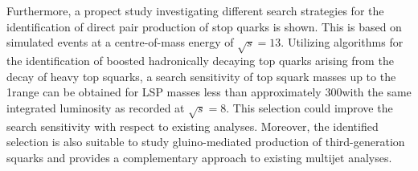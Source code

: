 Furthermore, a propect study investigating different search strategies for the identification of direct pair production of stop quarks is shown. This is based on simulated events at a centre-of-mass energy of $\sqrt{s}=13$\tev. Utilizing algorithms for the identification of boosted hadronically decaying top quarks arising from the decay of heavy top squarks, a search sensitivity of top squark masses up to the 1\tev range can be obtained for LSP masses less than approximately 300\gev with the same integrated luminosity as recorded at $\sqrt{s}=8$\tev. This selection could improve the search sensitivity with respect to existing analyses. Moreover, the identified selection is also suitable to study gluino-mediated production of third-generation squarks and provides a complementary approach to existing multijet analyses.      
